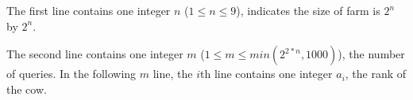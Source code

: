 The first line contains one integer $n$ ($1 \le n \le 9$), indicates the size of farm is $2^n$ by $2^n$.

The second line contains one integer $m$ ($1 \le m \le min(2^{2*n}, 1000)$), the number of queries.
In the following $m$ line, the $i$th line contains one integer $a_i$, the rank of the cow.
